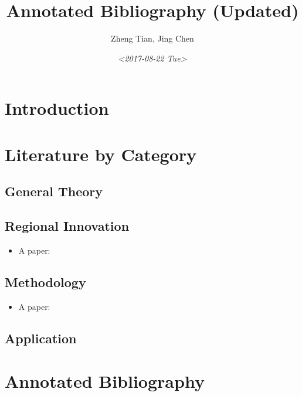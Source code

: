 \documentclass[a4paper,11pt]{article}
\author{Zheng Tian, Jing Chen}
\date{\textit{<2017-08-22 Tue>}}
\title{Annotated Bibliography (Updated)}
\begin{document}
\maketitle


\section{Introduction \label{introduction}}
\label{sec:org26b27ab}

\section{Literature by Category \label{lit_category}}
\label{sec:orgfcf6489}

\subsection{General Theory}

\subsection{Regional Innovation}
\begin{itemize}
\item A paper: \cite{simmie_innovation_2003}
\end{itemize}

\subsection{Methodology}
\begin{itemize}
\item A paper: \cite{acs_patents_2002}
\end{itemize}

\subsection{Application}

\section{Annotated Bibliography \label{annotated_bib}}
\label{sec:org8457eae}




\end{document}
